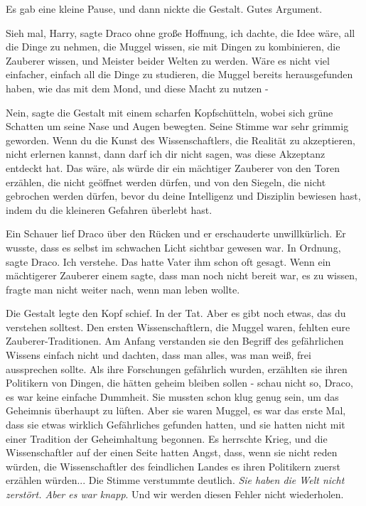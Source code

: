 Es gab eine kleine Pause, und dann nickte die Gestalt. \glqq Gutes
Argument.\grqq{}

\glqq Sieh mal, Harry\grqq{}, sagte Draco ohne große Hoffnung, \glqq ich
dachte, die Idee wäre, all die Dinge zu nehmen, die Muggel wissen, sie mit
Dingen zu kombinieren, die Zauberer wissen, und Meister beider Welten zu werden.
Wäre es nicht viel einfacher, einfach all die Dinge zu studieren, die Muggel
bereits herausgefunden haben, wie das mit dem Mond, und diese Macht zu nutzen
-\grqq{}

\glqq Nein\grqq{}, sagte die Gestalt mit einem scharfen Kopfschütteln, wobei
sich grüne Schatten um seine Nase und Augen bewegten. Seine Stimme war sehr
grimmig geworden. \glqq Wenn du die Kunst des Wissenschaftlers, die Realität zu
akzeptieren, nicht erlernen kannst, dann darf ich dir nicht sagen, was diese
Akzeptanz entdeckt hat. Das wäre, als würde dir ein mächtiger Zauberer von den
Toren erzählen, die nicht geöffnet werden dürfen, und von den Siegeln, die nicht
gebrochen werden dürfen, bevor du deine Intelligenz und Disziplin bewiesen hast,
indem du die kleineren Gefahren überlebt hast.\grqq{}

Ein Schauer lief Draco über den Rücken und er erschauderte unwillkürlich. Er
wusste, dass es selbst im schwachen Licht sichtbar gewesen war. \glqq In
Ordnung\grqq{}, sagte Draco. \glqq Ich verstehe.\grqq{} Das hatte Vater ihm
schon oft gesagt. Wenn ein mächtigerer Zauberer einem sagte, dass man noch nicht
bereit war, es zu wissen, fragte man nicht weiter nach, wenn man leben wollte.

Die Gestalt legte den Kopf schief. \glqq In der Tat. Aber es gibt noch etwas,
das du verstehen solltest. Den ersten Wissenschaftlern, die Muggel waren,
fehlten eure Zauberer-Traditionen. Am Anfang verstanden sie den Begriff des
gefährlichen Wissens einfach nicht und dachten, dass man alles, was man weiß,
frei aussprechen sollte. Als ihre Forschungen gefährlich wurden, erzählten sie
ihren Politikern von Dingen, die hätten geheim bleiben sollen - schau nicht so,
Draco, es war keine einfache Dummheit. Sie mussten schon klug genug sein, um das
Geheimnis überhaupt zu lüften. Aber sie waren Muggel, es war das erste Mal, dass
sie etwas wirklich Gefährliches gefunden hatten, und sie hatten nicht mit einer
Tradition der Geheimhaltung begonnen. Es herrschte Krieg, und die
Wissenschaftler auf der einen Seite hatten Angst, dass, wenn sie nicht reden
würden, die Wissenschaftler des feindlichen Landes es ihren Politikern zuerst
erzählen würden...\grqq{} Die Stimme verstummte deutlich. \glqq \emph{Sie haben
die Welt nicht zerstört. Aber es war knapp}. Und wir werden diesen Fehler nicht
wiederholen.\grqq{}

